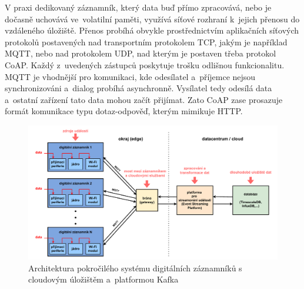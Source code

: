 V praxi dedikovaný záznamník, který data buď přímo zpracovává, nebo je dočasně uchovává ve~volatilní paměti, využívá síťové rozhraní k~jejich přenosu do vzdáleného úložiště. Přenos probíhá obvykle prostřednictvím aplikačních síťových protokolů postavených nad transportním protokolem TCP, jakým je například MQTT, nebo nad protokolem UDP, nad kterým je postaven třeba protokol CoAP. Každý z~uvedených zástupců poskytuje trošku odlišnou funkcionalitu. MQTT je vhodnější pro komunikaci, kde odesílatel a~příjemce nejsou synchronizováni a~dialog probíhá asynchronně. Vysílatel tedy odesílá data a~ostatní zařízení tato data mohou začít přijímat. Zato CoAP zase prosazuje formát komunikace typu dotaz-odpověď, kterým mimikuje HTTP.~\cite{emq_mqtt_vs_coap, smart_datalogger_data_acquisition_cpu, iot_datalogger_with_timestamping}


\begin{figure}[h]
    \centering
    \includegraphics[width=1.00\textwidth]{obrazky-figures/advanced_architecture_of_datalogging.pdf}
    
    \caption{Architektura pokročilého systému digitálních záznamníků s cloudovým úložištěm a~platformou Kafka~\cite{confluent_advanced_datalogging}}
    \label{fig:advanced-architecture-of-datalogging}
\end{figure}


